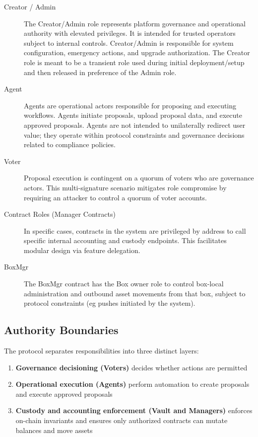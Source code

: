 \documentclass[10pt]{article}
\begin{document}
\begin{description}
    \item[Creator / Admin]
          The Creator/Admin role represents platform governance and operational authority with elevated privileges. It is intended for trusted operators subject to internal controls. Creator/Admin is responsible for system configuration, emergency actions, and upgrade authorization. The Creator role is meant to be a transient role
          used during initial deployment/setup and then released in preference of the Admin role.

    \item[Agent]
          Agents are operational actors responsible for proposing and executing workflows. Agents initiate proposals, upload proposal data, and execute approved proposals. Agents are not intended to unilaterally redirect user value; they operate within protocol constraints and governance decisions related to compliance policies.

    \item[Voter]
          Proposal execution is contingent on a quorum of voters who are governance actors. This multi-signature scenario mitigates role compromise by requiring an attacker to control a quorum of voter accounts.

    \item[Contract Roles (Manager Contracts)]
          In specific cases, contracts in the system are privileged by address to call
          specific internal accounting and custody endpoints. This facilitates modular design via feature delegation.

    \item[BoxMgr]
          The BoxMgr contract has the Box owner role to control box-local administration and outbound asset movements from that box, subject to protocol constraints (eg pushes initiated by the system).
\end{description}

\subsection{Authority Boundaries}

The protocol separates responsibilities into three distinct layers:
\begin{enumerate}
    \item \textbf{Governance decisioning (Voters)} decides whether actions are permitted
    \item \textbf{Operational execution (Agents)} perform automation to create proposals and execute approved proposals
    \item \textbf{Custody and accounting enforcement (Vault and Managers)} enforces on-chain invariants and ensures only authorized contracts can mutate balances and move assets
\end{enumerate}
\end{document}
